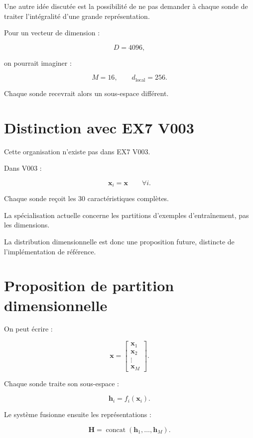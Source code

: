 \documentclass[11pt,a4paper]{report}
\newcommand{\concat}{\operatorname{concat}}
\newcommand{\vect}[1]{\bm{#1}}
\begin{document}
Une autre idée discutée est la possibilité de ne pas demander
à chaque sonde de traiter l'intégralité d'une grande
représentation.

Pour un vecteur de dimension :

\[
D=4096,
\]

on pourrait imaginer :

\[
M=16,\qquad d_{\mathrm{local}}=256.
\]

Chaque sonde recevrait alors un sous-espace différent.

\section{Distinction avec EX7 V003}

Cette organisation n'existe pas dans EX7 V003.

Dans V003 :

\[
\vect{x}_i=\vect{x}
\qquad
\forall i.
\]

Chaque sonde reçoit les 30 caractéristiques complètes.

La spécialisation actuelle concerne les partitions d'exemples
d'entraînement, pas les dimensions.

La distribution dimensionnelle est donc une proposition
future, distincte de l'implémentation de référence.

\section{Proposition de partition dimensionnelle}

On peut écrire :

\[
\vect{x}
=
\begin{bmatrix}
\vect{x}_1\\
\vect{x}_2\\
\vdots\\
\vect{x}_M
\end{bmatrix}.
\]

Chaque sonde traite son sous-espace :

\[
\vect{h}_i
=
f_i(\vect{x}_i).
\]

Le système fusionne ensuite les représentations :

\[
\vect{H}
=
\concat(\vect{h}_1,\ldots,\vect{h}_M).
\]
\end{document}
